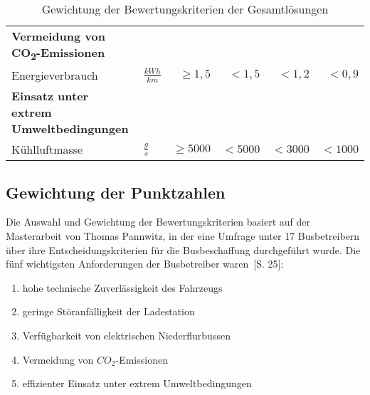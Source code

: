 \begin{table}
\begin{tabulary}{\linewidth}{LLrrrr}
		\textbf{Vermeidung von CO\textsubscript{2}-Emissionen}   &                  &            &         &           &  \\
		Energieverbrauch                                         & $\frac{kWh}{km}$ &  $\ge 1,5$ &  $<1,5$ &    $<1,2$ &       $<0,9$ \\ \midrule
		\textbf{Einsatz unter extrem Umweltbedingungen}          &                  &            &         &           &  \\
		Kühlluftmasse                                            & $\frac{g}{s}$     & $\ge 5000$ & $<5000$ &   $<3000$ &      $<1000$ \\ \bottomrule
	\end{tabulary}
	\caption{Gewichtung der Bewertungskriterien der Gesamtlösungen}
	\label{tab_punktzahlen}
\end{table} 

\subsection{Gewichtung der Punktzahlen}
Die Auswahl und Gewichtung der Bewertungskriterien basiert auf der Masterarbeit von Thomas Pannwitz, in der eine Umfrage unter 17 Busbetreibern über ihre Entscheidungskriterien für die Busbeschaffung durchgeführt wurde. Die fünf wichtigsten Anforderungen der Busbetreiber waren~\cite{pannwitz2014}[S. 25]:
\begin{enumerate}
	\item hohe technische Zuverlässigkeit des Fahrzeugs
	\item geringe Störanfälligkeit der Ladestation
	\item Verfügbarkeit von elektrischen Niederflurbussen
	\item Vermeidung von $CO_2$-Emissionen
	\item effizienter Einsatz unter extrem Umweltbedingungen
\end{enumerate}

